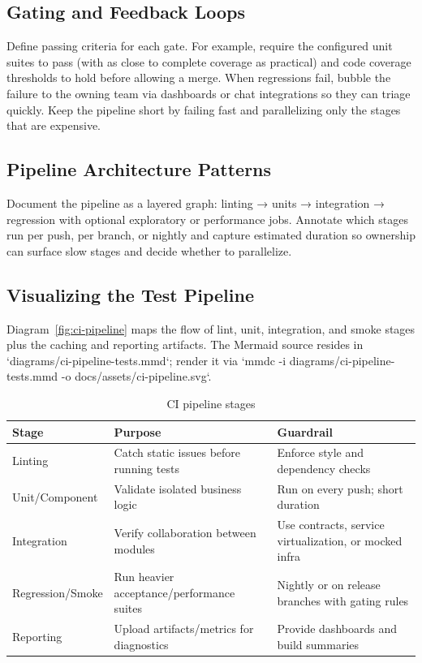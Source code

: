 \subsection{Gating and Feedback Loops}

Define passing criteria for each gate. For example, require the configured unit suites to pass (with as close to complete coverage as practical) and code coverage thresholds to hold before allowing a merge. When regressions fail, bubble the failure to the owning team via dashboards or chat integrations so they can triage quickly. Keep the pipeline short by failing fast and parallelizing only the stages that are expensive.

\subsection{Pipeline Architecture Patterns}

Document the pipeline as a layered graph: linting → units → integration → regression with optional exploratory or performance jobs. Annotate which stages run per push, per branch, or nightly and capture estimated duration so ownership can surface slow stages and decide whether to parallelize.

\subsection{Visualizing the Test Pipeline}

Diagram~\ref{fig:ci-pipeline} maps the flow of lint, unit, integration, and smoke stages plus the caching and reporting artifacts. The Mermaid source resides in `diagrams/ci-pipeline-tests.mmd`; render it via `mmdc -i diagrams/ci-pipeline-tests.mmd -o docs/assets/ci-pipeline.svg`.



\begin{table}[h]
\centering
\caption{CI pipeline stages}
\label{tab:pipeline-stages}
\begin{tabular}{p{3cm}p{5cm}p{3cm}}
\toprule
Stage & Purpose & Guardrail \\
\midrule
Linting & Catch static issues before running tests & Enforce style and dependency checks \\
Unit/Component & Validate isolated business logic & Run on every push; short duration \\
Integration & Verify collaboration between modules & Use contracts, service virtualization, or mocked infra \\
Regression/Smoke & Run heavier acceptance/performance suites & Nightly or on release branches with gating rules \\
Reporting & Upload artifacts/metrics for diagnostics & Provide dashboards and build summaries \\
\bottomrule
\end{tabular}
\end{table}

